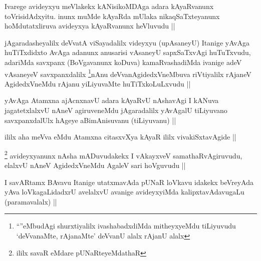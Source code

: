 
\begin{artha}
Ivarege avideyxyu meVlakekx kANisikoMDAga adara kAyaRvanunx toVrisidAdxyitu. inunx muMde kAyaRda mUlaka nikaqSaTxteyanunx hoMdutatxliruva avideyxya kAyaRvanunx heVluvudu ||
\end{artha}


\begin{artha}
jAgaradasheyalilx deVvatA viSayadalilx videyxyu (upAsaneyU) Itanige yAvAga huTiTxdidxto AvAga adanunx anusarisi vAsaneyU sapxSaTxvAgi huTuTxvudu, adariMda savxpanx (BoVgavanunx koDuva) kamaRvashadiMda ivanige adeV vAsaneyeV savxpanxdalilx \footnote{``\stext''eMbudAgi shurxtiyalilx ivashabadxdiMda mitheyxyeMdu tiLiyuvudu `deVvanaMte, rAjanaMte' deVvanU alalx rAjanU alalx}nAnu deVvanAgidedxVneMbuva riVtiyalilx rAjaneV AgidedxVneMdu rAjanu yiLiyuvaMte huTiTxkoLuLxvudu ||
\end{artha}


\begin{artha}
yAvAga Atamxna ajAcnxnavU adara kAyaRvU nAshavAgi I kANuva jagatetxlalxvU nAneV agiruveneMdu jAgaradalilx yAvAgalU tiLiyuvano savxpanxdalUlx hAgeye aBimAnisuvanu (tiLiyuvanu) ||
\end{artha}


\begin{artha}
ililx aha meVva eMdu Atamxna citasxvXya kAyaR ililx vivakiSxtavAgide ||
\end{artha}


\begin{artha}
\footnote{ililx savaR eMdare pUNaRteyeMdathaR}
avideyxyanunx nAsha mADuvudakekx I vAkayxveV samathaRvAgiruvudu, elalxvU nAneV AgidedxVneMdu AgaleV sari hoVguvudu ||
\end{artha}


\begin{artha}
I savARtamx BAvavu Itanige utatxmavAda pUNaR loVkavu idakekx beVreyAda yAva loVkagaLidadxrU avelalxvU avanige avideyxyiMda kalipxtavAdavugaLu (paramavalalx) ||
\end{artha}

